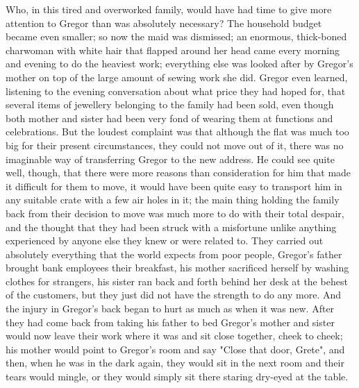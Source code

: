 Who, in this tired and overworked family, would have had time to give more attention to Gregor than was absolutely necessary? The household budget became even smaller; so now the maid was dismissed; an enormous, thick-boned charwoman with white hair that flapped around her head came every morning and evening to do the heaviest work; everything else was looked after by Gregor's mother on top of the large amount of sewing work she did. Gregor even learned, listening to the evening conversation about what price they had hoped for, that several items of jewellery belonging to the family had been sold, even though both mother and sister had been very fond of wearing them at functions and celebrations. But the loudest complaint was that although the flat was much too big for their present circumstances, they could not move out of it, there was no imaginable way of transferring Gregor to the new address. He could see quite well, though, that there were more reasons than consideration for him that made it difficult for them to move, it would have been quite easy to transport him in any suitable crate with a few air holes in it; the main thing holding the family back from their decision to move was much more to do with their total despair, and the thought that they had been struck with a misfortune unlike anything experienced by anyone else they knew or were related to. They carried out absolutely everything that the world expects from poor people, Gregor's father brought bank employees their breakfast, his mother sacrificed herself by washing clothes for strangers, his sister ran back and forth behind her desk at the behest of the customers, but they just did not have the strength to do any more. And the injury in Gregor's back began to hurt as much as when it was new. After they had come back from taking his father to bed Gregor's mother and sister would now leave their work where it was and sit close together, cheek to cheek; his mother would point to Gregor's room and say "Close that door, Grete", and then, when he was in the dark again, they would sit in the next room and their tears would mingle, or they would simply sit there staring dry-eyed at the table.


